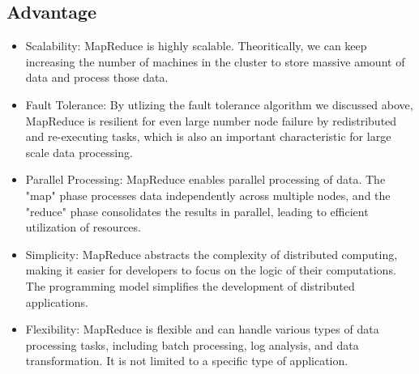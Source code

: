 \documentclass{article}
\begin{document}
\subsection{Advantage}
\begin{itemize}
      \item Scalability:
      MapReduce is highly scalable. Theoritically, we can keep increasing the number of machines in the cluster to store massive amount of data and process those
      data.
      \item Fault Tolerance:
      By utlizing the fault tolerance algorithm we discussed above, MapReduce is resilient for even large number node failure by redistributed and re-executing tasks, which is 
      also an important characteristic for large scale data processing.
      \item Parallel Processing:
      MapReduce enables parallel processing of data. The "map" phase processes data independently across multiple nodes,
       and the "reduce" phase consolidates the results in parallel, leading to efficient utilization of resources.
      \item Simplicity:
      MapReduce abstracts the complexity of distributed computing, making it easier for 
      developers to focus on the logic of their computations. The programming model simplifies the development of distributed applications.
      \item Flexibility:
      MapReduce is flexible and can handle various types of data processing tasks, 
      including batch processing, log analysis, and data transformation. It is not limited to a specific type of application.
\end{itemize}
\end{document}
